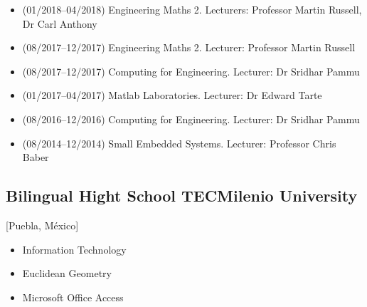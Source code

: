 \documentclass{mycv}
\begin{document}
\begin{positions}
\end{positions}
\begin{itemize}
	\item (01/2018--04/2018) Engineering Maths 2. Lecturers: Professor Martin Russell, Dr Carl Anthony 
	\item (08/2017--12/2017) Engineering Maths 2. Lecturer: Professor Martin Russell 
	\item (08/2017--12/2017) Computing for Engineering. Lecturer: Dr Sridhar Pammu 
	\item (01/2017--04/2017) Matlab Laboratories. Lecturer: Dr Edward Tarte 
	\item (08/2016--12/2016) Computing for Engineering. Lecturer: Dr Sridhar Pammu 
	\item (08/2014--12/2014) Small Embedded Systems. Lecturer: Professor Chris Baber
\end{itemize}


\subsection{Bilingual Hight School TECMilenio University}[Puebla, M\'exico]
\begin{positions}
\end{positions}
\begin{itemize}
	\item Information Technology \href{https://sites.google.com/site/perezxochicale/teaching/iit}{\faExternalLink}
	\item Euclidean Geometry  \href{https://sites.google.com/site/perezxochicale/teaching/euclidean-geometry}{\faExternalLink}
	\item Microsoft Office Access \href{https://sites.google.com/site/perezxochicale/teaching/moa}{\faExternalLink}
\end{itemize}
\end{document}
